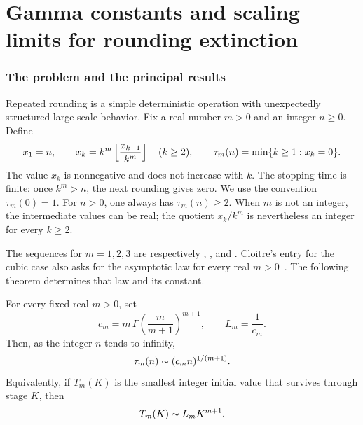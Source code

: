 \part{Gamma constants and scaling limits for rounding extinction}
\label{rex:part:one}

\section{The problem and the principal results}\label{rex:sec:results}

Repeated rounding is a simple deterministic operation with unexpectedly
structured large-scale behavior. Fix a real number $m>0$ and an integer
$n\geq0$. Define
\begin{equation}\label{rex:eq:forward}
 x_1=n,\qquad
 x_k=k^m\left\lfloor \frac{x_{k-1}}{k^m}\right\rfloor\quad(k\geq2),\qquad
 \tau_m(n)=\min\{k\geq1:x_k=0\}.
\end{equation}
The value $x_k$ is nonnegative and does not increase with $k$. The stopping
time is finite: once $k^m>n$, the next rounding gives zero. We use the
convention $\tau_m(0)=1$. For $n>0$, one always has $\tau_m(n)\geq2$.
When $m$ is not an integer, the intermediate values can be real; the
quotient $x_k/k^m$ is nevertheless an integer for every $k\geq2$.

The sequences for $m=1,2,3$ are respectively ,
, and . Cloitre's entry for the cubic case also
asks for the asymptotic law for every real $m>0$~\cite{oeis-linear,oeis-square,oeis-cube}.
The following theorem determines that law and its constant.

\begin{theorem}\label{rex:thm:main}
For every fixed real $m>0$, set
\begin{equation}\label{rex:eq:constants}
 c_m=m\,\Gamma\!\left(\frac{m}{m+1}\right)^{m+1},\qquad
 L_m=\frac1{c_m}.
\end{equation}
Then, as the integer $n$ tends to infinity,
\begin{equation}\label{rex:eq:main}
 \tau_m(n)\mathrel{\sim}(c_m n)^{1/(m+1)}.
\end{equation}
Equivalently, if $T_m(K)$ is the smallest integer initial value that
survives through stage $K$, then
\begin{equation}\label{rex:eq:threshold-main}
 T_m(K)\mathrel{\sim} L_m K^{m+1}.
\end{equation}
\end{theorem}

